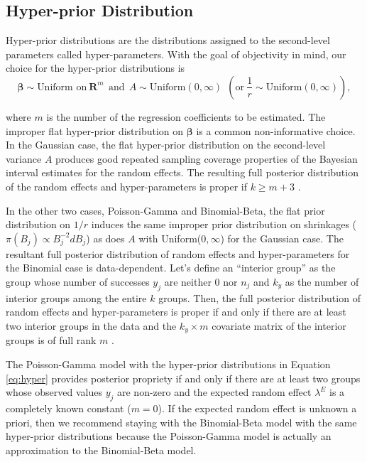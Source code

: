 \documentclass[article]{jss}
\begin{document}
\subsection[Hyper-prior distributions]{Hyper-prior Distribution}
Hyper-prior distributions are the distributions assigned to the second-level parameters called hyper-parameters. With the goal of objectivity in mind, our choice for the hyper-prior distributions is
\begin{equation}\label{eq:hyper}
\boldsymbol{\beta} \sim \textrm{Uniform on}~ \textbf{R}^{m}~~\textrm{and}~~A \sim \textrm{Uniform}(0, \infty) ~~(\textrm{or} ~\frac{1}{r}\sim \textrm{Uniform}(0, \infty)),
\end{equation}

where $m$ is the number of the regression coefficients to be estimated. The improper flat hyper-prior distribution on $\boldsymbol{\beta}$ is a common non-informative choice.  In the Gaussian case, the flat hyper-prior distribution on the second-level variance $A$ produces good repeated sampling coverage properties of the Bayesian interval estimates for the random effects. The resulting full posterior distribution of the random effects and hyper-parameters is proper if $k\ge m+3$ \citep{tang2011, kelly2014advances}. 


In the other two cases, Poisson-Gamma and Binomial-Beta, the flat prior distribution on $1/r$ induces the same improper prior distribution on shrinkages ($\pi(B_{j})\propto B_{j}^{-2} d B_j$) as does $A$ with Uniform($0, \infty$) for the Gaussian case. The resultant full posterior distribution of random effects and hyper-parameters for the Binomial case is data-dependent. Let's define an ``interior group'' as the group whose number of successes $y_j$ are neither 0 nor $n_j$ and $k_y$ as the number of interior groups among the entire $k$ groups. Then, the full posterior distribution of random effects and hyper-parameters is proper if and only if there are at least two interior groups in the data and the $k_y\times m$ covariate matrix of the interior groups is of full rank $m$ \citep{tak2016propriety}. 


The Poisson-Gamma model with the hyper-prior distributions in Equation \ref{eq:hyper} provides posterior propriety if and only if there are at least two groups whose observed values $y_j$ are non-zero  and the expected random effect $\lambda^E$ is a completely known constant ($m=0$). If the expected random effect is unknown a priori,  then we recommend staying with the Binomial-Beta model with the same hyper-prior distributions because the Poisson-Gamma model is actually an approximation to the Binomial-Beta model. 
\end{document}
